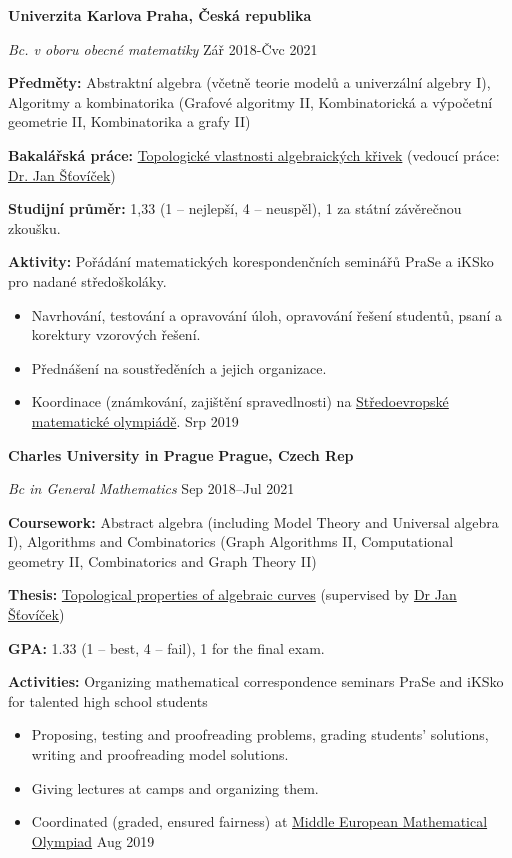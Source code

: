 \ifczech
\textbf{Univerzita Karlova} \hfill \textbf{Praha, Česká republika} \par
\textit{Bc. v oboru obecné matematiky} \hfill Zář 2018-Čvc 2021 \par
\textbf{Předměty:} Abstraktní algebra (včetně teorie modelů a univerzální algebry I), Algoritmy a kombinatorika (Grafové algoritmy II, Kombinatorická a výpočetní geometrie II, Kombinatorika a grafy II) \par
\textbf{Bakalářská práce:} \href{https://dspace.cuni.cz/handle/20.500.11956/128190}{Topologické vlastnosti algebraických křivek} (vedoucí práce: \href{https://scholar.google.com/scholar?hl=en&as_sdt=0\%2C5&q=jan+šťovíček&btnG=}{Dr. Jan Šťovíček}) \par
\textbf{Studijní průměr:} 1,33 (1 -- nejlepší, 4 -- neuspěl), 1 za státní závěrečnou zkoušku. \par
\textbf{Aktivity:} Pořádání matematických korespondenčních seminářů PraSe a iKSko pro nadané středoškoláky.
\begin{itemize}
\item Navrhování, testování a opravování úloh, opravování řešení studentů, psaní a korektury vzorových řešení.
\item Přednášení na soustředěních a jejich organizace.
\item Koordinace (známkování, zajištění spravedlnosti) na \href{https://memo2019.karlin.mff.cuni.cz/#/staff}{Středoevropské matematické olympiádě}. \hfill Srp 2019
\end{itemize}

\else

\textbf{Charles University in Prague} \hfill \textbf{Prague, Czech Rep} \par
\textit{Bc in General Mathematics} \hfill Sep 2018--Jul 2021 \par
\textbf{Coursework:} Abstract algebra (including Model Theory and Universal algebra I), Algorithms and Combinatorics (Graph Algorithms II, Computational geometry II, Combinatorics and Graph Theory II) \par
\textbf{Thesis:} \href{https://dspace.cuni.cz/handle/20.500.11956/128190}{Topological properties of algebraic curves} (supervised by \href{https://scholar.google.com/scholar?hl=en&as_sdt=0\%2C5&q=jan+šťovíček&btnG=}{Dr Jan Šťovíček}) \par
\textbf{GPA:} 1.33 (1 -- best, 4 -- fail), 1 for the final exam. \par
\textbf{Activities:} Organizing mathematical correspondence seminars PraSe and iKSko for talented high school students
\begin{itemize}
    \item Proposing, testing and proofreading problems, grading students' solutions, writing and proofreading model solutions.
    \item Giving lectures at camps and organizing them.
    \item Coordinated (graded, ensured fairness) at \href{https://memo2019.karlin.mff.cuni.cz/#/staff}{Middle European Mathematical Olympiad} \hfill Aug 2019
\end{itemize}

\fi
